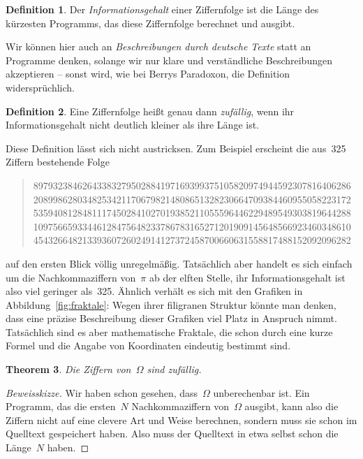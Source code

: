 \documentclass[twoside]{../zirkelblatt1415}
\theoremstyle{definition}
\newtheorem{defn}{Definition}[section]
\theoremstyle{plain}
\newtheorem{thm}[defn]{Theorem}
\theoremstyle{remark}
\begin{document}
\begin{defn}Der \emph{Informationsgehalt} einer Ziffernfolge ist die Länge des
kürzesten Programms, das diese Ziffernfolge berechnet und ausgibt.\end{defn}

Wir können hier auch an \emph{Beschreibungen durch deutsche Texte} statt an
Programme denken, solange wir nur klare und verständliche Beschreibungen
akzeptieren -- sonst wird, wie bei Berrys Paradoxon, die Definition
widersprüchlich.

\begin{defn}Eine Ziffernfolge heißt genau dann \emph{zufällig}, wenn ihr
Informationsgehalt nicht deutlich kleiner als ihre Länge ist.\end{defn}

Diese Definition lässt sich nicht austricksen. Zum Beispiel erscheint die
aus~325 Ziffern bestehende Folge
\begin{quote}
89793238462643383279502884197169399375105820974944592307816406286 \\
20899862803482534211706798214808651328230664709384460955058223172 \\
53594081284811174502841027019385211055596446229489549303819644288 \\
10975665933446128475648233786783165271201909145648566923460348610 \\
45432664821339360726024914127372458700660631558817488152092096282
\end{quote}

auf den ersten Blick völlig unregelmäßig. Tatsächlich aber handelt es sich
einfach um die Nachkommaziffern von~$\pi$ ab der elften Stelle, ihr
Informationsgehalt ist also viel geringer als~325. Ähnlich verhält es sich mit
den Grafiken in Abbildung~\ref{fig:fraktale}: Wegen ihrer filigranen Struktur könnte man denken, dass
eine präzise Beschreibung dieser Grafiken viel Platz in Anspruch nimmt.
Tatsächlich sind es aber mathematische Fraktale, die schon durch eine kurze
Formel und die Angabe von Koordinaten eindeutig bestimmt sind.

\begin{thm}Die Ziffern von~$\Omega$ sind zufällig.\end{thm}
\begin{proof}[Beweisskizze]Wir haben schon gesehen, dass~$\Omega$ unberechenbar
ist. Ein Programm, das die ersten~$N$ Nachkommaziffern von~$\Omega$ ausgibt,
kann also die Ziffern nicht auf eine clevere Art und Weise berechnen, sondern
muss sie schon im Quelltext gespeichert haben. Also muss der Quelltext in etwa
selbst schon die Länge~$N$ haben.
\end{proof}
\end{document}
